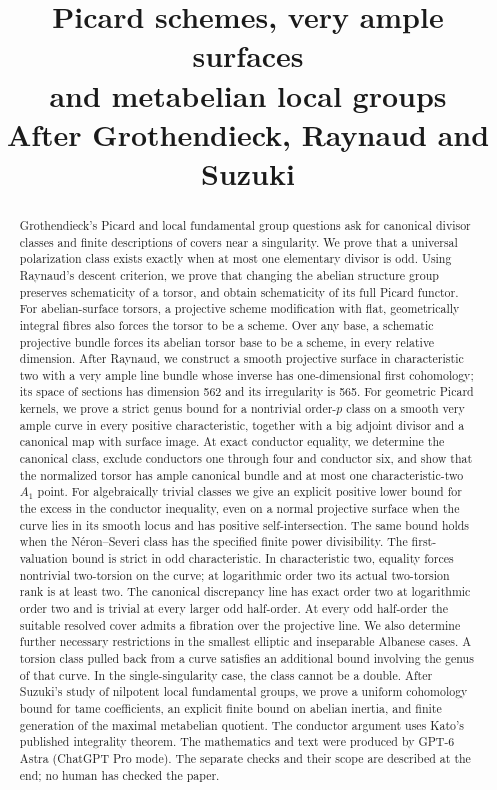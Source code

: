 \documentclass[11pt]{article}
\title{Picard schemes, very ample surfaces\\and metabelian local groups\\[0.3em]\large After Grothendieck, Raynaud and Suzuki}
\author{}
\date{}
\theoremstyle{remark}\newtheorem{remark}[theorem]{Remark}
\begin{document}
\maketitle
\vspace{-2em}
\begin{abstract}
Grothendieck's Picard and local fundamental group questions ask for canonical divisor classes and finite descriptions of covers near a singularity. We prove that a universal polarization class exists exactly when at most one elementary divisor is odd. Using Raynaud's descent criterion, we prove that changing the abelian structure group preserves schematicity of a torsor, and obtain schematicity of its full Picard functor. For abelian-surface torsors, a projective scheme modification with flat, geometrically integral fibres also forces the torsor to be a scheme. Over any base, a schematic projective bundle forces its abelian torsor base to be a scheme, in every relative dimension. After Raynaud, we construct a smooth projective surface in characteristic two with a very ample line bundle whose inverse has one-dimensional first cohomology; its space of sections has dimension 562 and its irregularity is 565. For geometric Picard kernels, we prove a strict genus bound for a nontrivial order-$p$ class on a smooth very ample curve in every positive characteristic, together with a big adjoint divisor and a canonical map with surface image. At exact conductor equality, we determine the canonical class, exclude conductors one through four and conductor six, and show that the normalized torsor has ample canonical bundle and at most one characteristic-two $A_1$ point. For algebraically trivial classes we give an explicit positive lower bound for the excess in the conductor inequality, even on a normal projective surface when the curve lies in its smooth locus and has positive self-intersection. The same bound holds when the N\'eron--Severi class has the specified finite power divisibility. The first-valuation bound is strict in odd characteristic. In characteristic two, equality forces nontrivial two-torsion on the curve; at logarithmic order two its actual two-torsion rank is at least two. The canonical discrepancy line has exact order two at logarithmic order two and is trivial at every larger odd half-order. At every odd half-order the suitable resolved cover admits a fibration over the projective line. We also determine further necessary restrictions in the smallest elliptic and inseparable Albanese cases. A torsion class pulled back from a curve satisfies an additional bound involving the genus of that curve. In the single-singularity case, the class cannot be a double. After Suzuki's study of nilpotent local fundamental groups, we prove a uniform cohomology bound for tame coefficients, an explicit finite bound on abelian inertia, and finite generation of the maximal metabelian quotient. The conductor argument uses Kato's published integrality theorem. The mathematics and text were produced by GPT-6 Astra (ChatGPT Pro mode). The separate checks and their scope are described at the end; no human has checked the paper.
\end{abstract}
\end{document}

